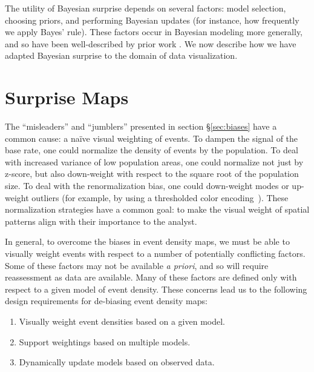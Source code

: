 \documentclass[journal]{vgtc}                %
\begin{document}
The utility of Bayesian surprise depends on several factors: model selection, choosing priors, and performing Bayesian updates (for instance, how frequently we apply Bayes' rule). These factors occur in Bayesian modeling more generally, and so have been well-described by prior work \cite{box2011bayesian, hoeting1999bayesian}. We now describe how we have adapted Bayesian surprise to the domain of data visualization.

\section{Surprise Maps}
\label{sec:technique}

The ``misleaders'' and ``jumblers'' presented in section \S\ref{sec:biases} have a common cause: a na\"ive visual weighting of events. To dampen the signal of the base rate, one could normalize the density of events by the population. To deal with increased variance of low population areas, one could normalize not just by z-score, but also down-weight with respect to the square root of the population size. To deal with the renormalization bias, one could down-weight modes or up-weight outliers (for example, by using a thresholded color encoding~\cite{liu2013immens}). These normalization strategies have a common goal: to make the visual weight of spatial patterns align with their importance to the analyst.


In general, to overcome the biases in event density maps, we must be able to visually weight events with respect to a number of potentially conflicting factors. Some of these factors may not be available \emph{a priori}, and so will require reassessment as data are available.  Many of these factors are defined only with respect to a given model of event density. These concerns lead us to the following design requirements for de-biasing event density maps:

\begin{enumerate}
  \itemsep0em
	\item Visually weight event densities based on a given model.
	\item Support weightings based on multiple models.
	\item Dynamically update models based on observed data.
\end{enumerate}
\end{document}
